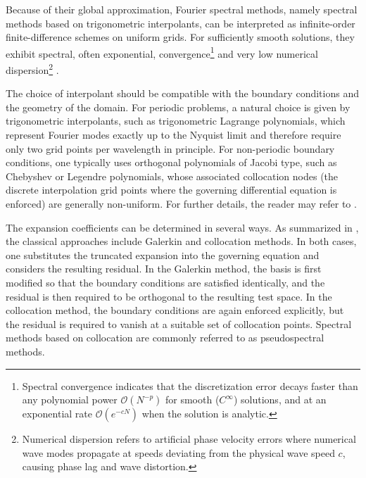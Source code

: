 \documentclass{Configuration_Files/PoliMi3i_thesis}
\newif\ifshowthesischanges
\DeclareRobustCommand{\thesischange}[2]{%
    \ifshowthesischanges
        \textcolor{#1}{#2}%
    \else
        #2%
    \fi
}
\def\thesischange#1#2{#2}%
\begin{document}
Because of their global approximation, Fourier spectral methods, namely spectral methods based on trigonometric interpolants, can be interpreted as infinite-order finite-difference schemes on uniform grids. For sufficiently smooth solutions, they exhibit spectral, often exponential, convergence\footnote{\thesischange{red}{Spectral convergence indicates that the discretization error decays faster than any polynomial power $\mathcal{O}(N^{-p})$ for smooth ($C^\infty$) solutions, and at an exponential rate $\mathcal{O}(e^{-c N})$ when the solution is analytic.}} and very low numerical dispersion\footnote{\thesischange{red}{Numerical dispersion refers to artificial phase velocity errors where numerical wave modes propagate at speeds deviating from the physical wave speed $c$, causing phase lag and wave distortion.}} \citep{hesthaven_spectral_2007}.

The choice of interpolant should be compatible with the boundary conditions and the geometry of the domain. For periodic problems, a natural choice is given by trigonometric interpolants, such as trigonometric Lagrange polynomials, which represent Fourier modes exactly up to the Nyquist limit and therefore require only two grid points per wavelength in principle. For non-periodic boundary conditions, one typically uses orthogonal polynomials of Jacobi type, such as Chebyshev or Legendre polynomials, whose associated \thesischange{red}{collocation nodes (the discrete interpolation grid points where the governing differential equation is enforced)} are generally non-uniform. For further details, the reader may refer to \cite{hesthaven_spectral_2007,fornberg_practical_1996}.

The expansion coefficients can be determined in several ways. As summarized in \cite{fornberg_practical_1996}, \thesischange{red}{the classical approaches include Galerkin and collocation methods. In both cases}, one substitutes the truncated expansion into the governing equation and considers the resulting residual. In the Galerkin method, the basis is first modified so that the boundary conditions are satisfied identically, and the residual is then required to be orthogonal to the resulting test space. In the collocation method, the boundary conditions are again enforced explicitly, but the residual is required to vanish at a suitable set of collocation points. Spectral methods based on collocation are commonly referred to as pseudospectral methods.
\end{document}
